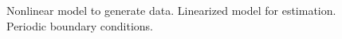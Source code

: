 \documentclass[conference]{IEEEtran}
\begin{document}
\begin{figure}[htbp]
	\centering
	\caption{Nonlinear model to generate data. Linearized model for estimation. Periodic boundary conditions.}
	\label{fig:label}
\end{figure}
\end{document}
